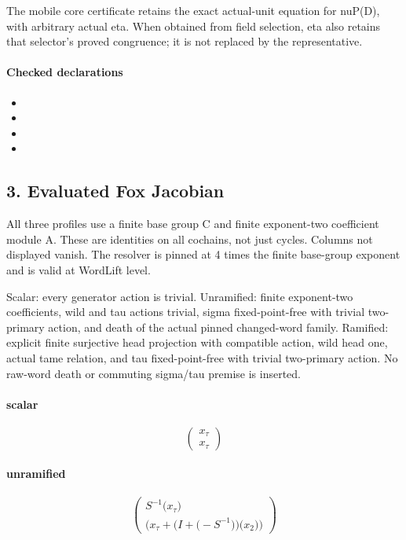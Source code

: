 The mobile core certificate retains the exact actual-unit equation for nuP(D), with arbitrary actual eta. When obtained from field selection, eta also retains that selector's proved congruence; it is not replaced by the representative.

\paragraph{Checked declarations}
\begin{itemize}
\item {}
\item {}
\item {}
\item {}
\end{itemize}

\subsection*{3. Evaluated Fox Jacobian}
All three profiles use a finite base group C and finite exponent-two coefficient module A. These are identities on all cochains, not just cycles. Columns not displayed vanish. The resolver is pinned at 4 times the finite base-group exponent and is valid at WordLift level.

Scalar: every generator action is trivial. Unramified: finite exponent-two coefficients, wild and tau actions trivial, sigma fixed-point-free with trivial two-primary action, and death of the actual pinned changed-word family. Ramified: explicit finite surjective head projection with compatible action, wild head one, actual tame relation, and tau fixed-point-free with trivial two-primary action. No raw-word death or commuting sigma/tau premise is inserted.

\paragraph{scalar}
\[\begin{pmatrix}x_{\tau}\\x_{\tau}\end{pmatrix}\]
\paragraph{unramified}
\[\begin{pmatrix}S^{-1}\bigl(x_{\tau}\bigr)\\\bigl(x_{\tau}+\bigl(I+\bigl(-S^{-1}\bigr)\bigr)\bigl(x_{2}\bigr)\bigr)\end{pmatrix}\]
